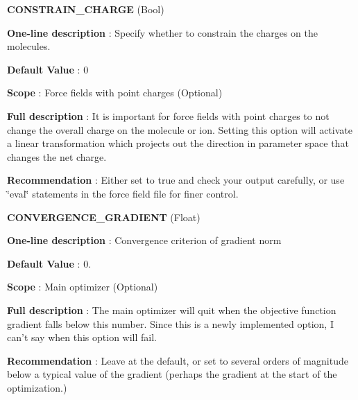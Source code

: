 \begin{DoxyItemize}
\item {\bfseries  \-C\-O\-N\-S\-T\-R\-A\-I\-N\-\_\-\-C\-H\-A\-R\-G\-E } (\-Bool) \par
{\bfseries  \-One-\/line description }\-: \-Specify whether to constrain the charges on the molecules. \par
{\bfseries  \-Default \-Value }\-: 0 \par
{\bfseries  \-Scope }\-: \-Force fields with point charges (\-Optional) \par
{\bfseries  \-Full description }\-: \-It is important for force fields with point charges to not change the overall charge on the molecule or ion. \-Setting this option will activate a linear transformation which projects out the direction in parameter space that changes the net charge. \par
{\bfseries  \-Recommendation }\-: \-Either set to true and check your output carefully, or use \char`\"{}eval\char`\"{} statements in the force field file for finer control.\end{DoxyItemize}
\begin{DoxyItemize}
\item {\bfseries  \-C\-O\-N\-V\-E\-R\-G\-E\-N\-C\-E\-\_\-\-G\-R\-A\-D\-I\-E\-N\-T } (\-Float) \par
{\bfseries  \-One-\/line description }\-: \-Convergence criterion of gradient norm \par
{\bfseries  \-Default \-Value }\-: 0. \par
{\bfseries  \-Scope }\-: \-Main optimizer (\-Optional) \par
{\bfseries  \-Full description }\-: \-The main optimizer will quit when the objective function gradient falls below this number. \-Since this is a newly implemented option, \-I can't say when this option will fail. \par
{\bfseries  \-Recommendation }\-: \-Leave at the default, or set to several orders of magnitude below a typical value of the gradient (perhaps the gradient at the start of the optimization.)\end{DoxyItemize}

